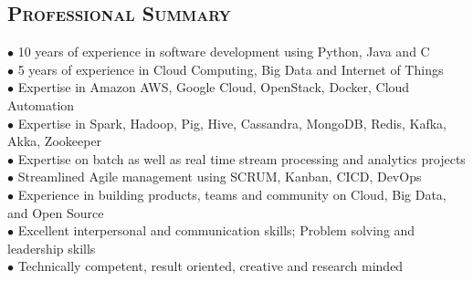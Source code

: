 \begin{resume}


\section{\textsc{Professional Summary}}
$\bullet$ 10 years of experience in software development using Python, Java and C\\
$\bullet$ 5 years of experience in Cloud Computing, Big Data and Internet of Things\\
$\bullet$ Expertise in Amazon AWS, Google Cloud, OpenStack, Docker, Cloud Automation\\
$\bullet$ Expertise in Spark, Hadoop, Pig, Hive, Cassandra, MongoDB, Redis, Kafka, Akka, Zookeeper\\
$\bullet$ Expertise on batch as well as real time stream processing and analytics projects\\
$\bullet$ Streamlined Agile management using SCRUM, Kanban, CICD, DevOps\\
$\bullet$ Experience in building products, teams and community on Cloud, Big Data, and Open Source\\
$\bullet$ Excellent interpersonal and communication skills; Problem solving and leadership skills\\
$\bullet$ Technically competent, result oriented, creative and research minded


\end{resume}
